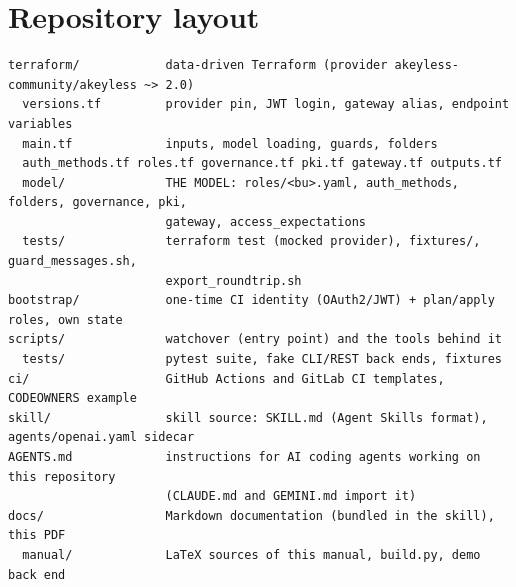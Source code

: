 \chapter{Repository layout}\label{app:layout}
\begin{lstlisting}
terraform/            data-driven Terraform (provider akeyless-community/akeyless ~> 2.0)
  versions.tf         provider pin, JWT login, gateway alias, endpoint variables
  main.tf             inputs, model loading, guards, folders
  auth_methods.tf roles.tf governance.tf pki.tf gateway.tf outputs.tf
  model/              THE MODEL: roles/<bu>.yaml, auth_methods, folders, governance, pki,
                      gateway, access_expectations
  tests/              terraform test (mocked provider), fixtures/, guard_messages.sh,
                      export_roundtrip.sh
bootstrap/            one-time CI identity (OAuth2/JWT) + plan/apply roles, own state
scripts/              watchover (entry point) and the tools behind it
  tests/              pytest suite, fake CLI/REST back ends, fixtures
ci/                   GitHub Actions and GitLab CI templates, CODEOWNERS example
skill/                skill source: SKILL.md (Agent Skills format), agents/openai.yaml sidecar
AGENTS.md             instructions for AI coding agents working on this repository
                      (CLAUDE.md and GEMINI.md import it)
docs/                 Markdown documentation (bundled in the skill), this PDF
  manual/             LaTeX sources of this manual, build.py, demo back end
\end{lstlisting}

